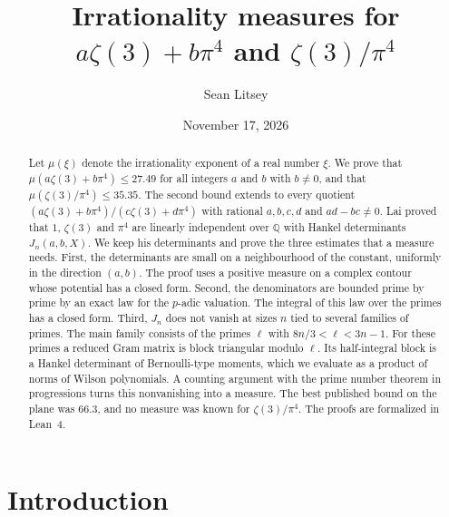 \documentclass[11pt]{amsart}
\theoremstyle{definition}
\theoremstyle{remark}
\numberwithin{equation}{section}
\newcommand{\Q}{\mathbb Q}
\begin{document}
\title[Measures for $a\zeta(3)+b\pi^4$ and $\zeta(3)/\pi^4$]{Irrationality measures for $a\zeta(3)+b\pi^4$
and $\zeta(3)/\pi^4$}

\author{Sean Litsey}

\date{November 17, 2026}



\begin{abstract}
Let $\mu(\xi)$ denote the irrationality exponent of a real number $\xi$. We prove that
$\mu(a\zeta(3)+b\pi^4)\le27.49$ for all integers $a$ and $b$ with $b\ne0$, and that $\mu(\zeta(3)/\pi^4)\le35.35$. The
second bound extends to every quotient $(a\zeta(3)+b\pi^4)/(c\zeta(3)+d\pi^4)$ with rational $a,b,c,d$ and
$ad-bc\ne0$. Lai proved that $1$, $\zeta(3)$ and $\pi^4$ are linearly independent over $\Q$ with Hankel determinants
$J_n(a,b,X)$. We keep his determinants and prove the three estimates that a measure needs. First, the determinants
are small on a neighbourhood of the constant, uniformly in the direction $(a,b)$. The proof uses a positive measure
on a complex contour whose potential has a closed form. Second, the denominators are bounded prime by prime by an
exact law for the $p$-adic valuation. The integral of this law over the primes has a closed form. Third, $J_n$ does
not vanish at sizes $n$ tied to several families of primes. The main family consists of the primes $\ell$ with
$8n/3<\ell<3n-1$. For these primes a reduced Gram matrix is block triangular modulo $\ell$. Its half-integral block is
a Hankel determinant of Bernoulli-type moments, which we evaluate as a product of norms of Wilson polynomials. A
counting argument with the prime number theorem in progressions turns this nonvanishing into a measure. The best
published bound on the plane was $66.3$, and no measure was known for $\zeta(3)/\pi^4$. The proofs are formalized in
Lean~4.
\end{abstract}

\maketitle
\tableofcontents

\section{Introduction}\label{sec:intro}
\end{document}
